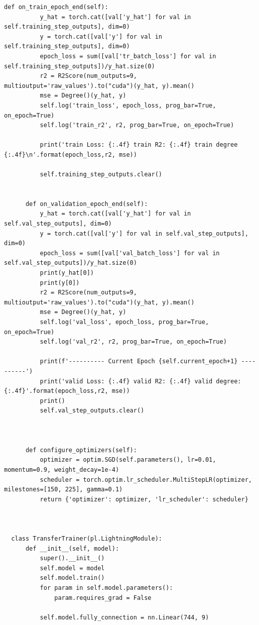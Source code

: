 \documentclass[a4paper,11pt,dvipdfmx]{jreport}
\begin{document}
\begin{lstlisting}[caption=印象判定用NN{,} DenseNetに関するソースコード, label=source]
      def on_train_epoch_end(self):
          y_hat = torch.cat([val['y_hat'] for val in self.training_step_outputs], dim=0)
          y = torch.cat([val['y'] for val in self.training_step_outputs], dim=0)
          epoch_loss = sum([val['tr_batch_loss'] for val in self.training_step_outputs])/y_hat.size(0)
          r2 = R2Score(num_outputs=9, multioutput='raw_values').to("cuda")(y_hat, y).mean()
          mse = Degree()(y_hat, y)
          self.log('train_loss', epoch_loss, prog_bar=True, on_epoch=True)
          self.log('train_r2', r2, prog_bar=True, on_epoch=True)
  
          print('train Loss: {:.4f} train R2: {:.4f} train degree {:.4f}\n'.format(epoch_loss,r2, mse))
  
          self.training_step_outputs.clear()
          
  
      def on_validation_epoch_end(self):
          y_hat = torch.cat([val['y_hat'] for val in self.val_step_outputs], dim=0)
          y = torch.cat([val['y'] for val in self.val_step_outputs], dim=0)
          epoch_loss = sum([val['val_batch_loss'] for val in self.val_step_outputs])/y_hat.size(0)
          print(y_hat[0])
          print(y[0])
          r2 = R2Score(num_outputs=9, multioutput='raw_values').to("cuda")(y_hat, y).mean()
          mse = Degree()(y_hat, y)
          self.log('val_loss', epoch_loss, prog_bar=True, on_epoch=True)
          self.log('val_r2', r2, prog_bar=True, on_epoch=True)
  
          print(f'---------- Current Epoch {self.current_epoch+1} ----------')
          print('valid Loss: {:.4f} valid R2: {:.4f} valid degree: {:.4f}'.format(epoch_loss,r2, mse))
          print()
          self.val_step_outputs.clear()
          
  
  
      def configure_optimizers(self):
          optimizer = optim.SGD(self.parameters(), lr=0.01, momentum=0.9, weight_decay=1e-4)
          scheduler = torch.optim.lr_scheduler.MultiStepLR(optimizer, milestones=[150, 225], gamma=0.1)
          return {'optimizer': optimizer, 'lr_scheduler': scheduler}
  
  
  
  class TransferTrainer(pl.LightningModule):
      def __init__(self, model):
          super().__init__()
          self.model = model
          self.model.train()
          for param in self.model.parameters():
              param.requires_grad = False
          
          self.model.fully_connection = nn.Linear(744, 9)
  

\end{lstlisting}
\end{document}
